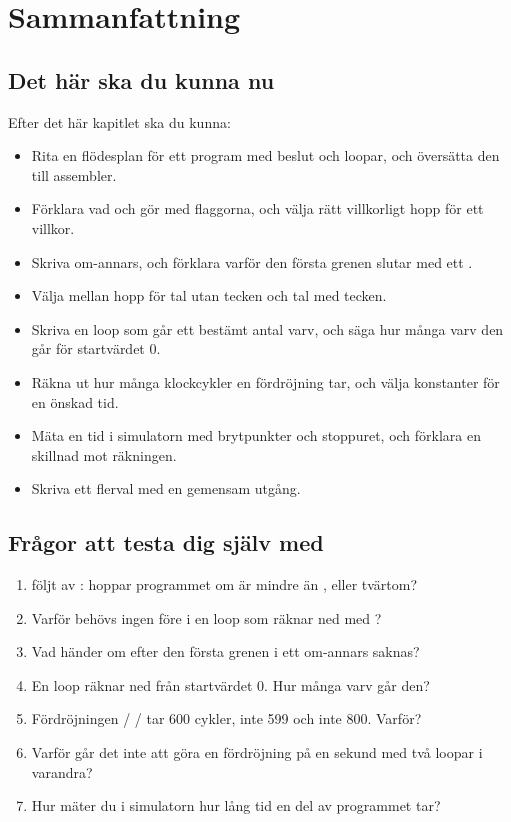 
\section{Sammanfattning}
\label{c9:sec:summary}

\subsection*{Det här ska du kunna nu}
Efter det här kapitlet ska du kunna:
\begin{itemize}
  \item Rita en flödesplan för ett program med beslut och loopar, och översätta den till
    assembler.
  \item Förklara vad  och  gör med flaggorna, och välja rätt villkorligt hopp
    för ett villkor.
  \item Skriva om-annars, och förklara varför den första grenen slutar med ett .
  \item Välja mellan hopp för tal utan tecken och tal med tecken.
  \item Skriva en loop som går ett bestämt antal varv, och säga hur många varv den går för
    startvärdet 0.
  \item Räkna ut hur många klockcykler en fördröjning tar, och välja konstanter för en önskad tid.
  \item Mäta en tid i simulatorn med brytpunkter och stoppuret, och förklara en skillnad mot
    räkningen.
  \item Skriva ett flerval med en gemensam utgång.
\end{itemize}

\subsection*{Frågor att testa dig själv med}
\begin{enumerate}
  \item {} följt av : hoppar programmet om  är mindre än
    , eller tvärtom?
  \item Varför behövs ingen  före  i en loop som räknar ned med ?
  \item Vad händer om  efter den första grenen i ett om-annars saknas?
  \item En loop räknar ned från startvärdet 0. Hur många varv går den?
  \item Fördröjningen  /  /  tar 600 cykler, inte 599
    och inte 800. Varför?
  \item Varför går det inte att göra en fördröjning på en sekund med två loopar i varandra?
  \item Hur mäter du i simulatorn hur lång tid en del av programmet tar?
\end{enumerate}

